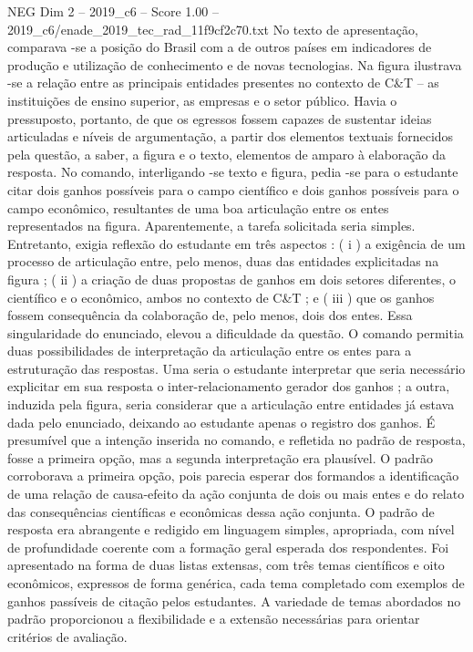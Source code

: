 \begin{textsample}{NEG Dim 2 – 2019\_c6 – Score 1.00 – 2019\_c6/enade\_2019\_tec\_rad\_11f9cf2c70.txt}
No texto de apresentação, comparava -se a posição do Brasil com a de outros países em indicadores de produção e utilização de conhecimento e de novas tecnologias.
Na figura ilustrava -se a relação entre as principais entidades presentes no contexto de C\&T – as instituições de ensino superior, as empresas e o setor público.
Havia o pressuposto, portanto, de que os egressos fossem capazes de sustentar ideias articuladas e níveis de argumentação, a partir dos elementos textuais fornecidos pela questão, a saber, a figura e o texto, elementos de amparo à elaboração da resposta.
No comando, interligando -se texto e figura, pedia -se para o estudante citar dois ganhos possíveis para o campo científico e dois ganhos possíveis para o campo econômico, resultantes de uma boa articulação entre os entes representados na figura.
Aparentemente, a tarefa solicitada seria simples.
Entretanto, exigia reflexão do estudante em três aspectos : ( i ) a exigência de um processo de articulação entre, pelo menos, duas das entidades explicitadas na figura ; ( ii ) a criação de duas propostas de ganhos em dois setores diferentes, o científico e o econômico, ambos no contexto de C\&T ; e ( iii ) que os ganhos fossem consequência da colaboração de, pelo menos, dois dos entes.
Essa singularidade do enunciado, elevou a dificuldade da questão.
O comando permitia duas possibilidades de interpretação da articulação entre os entes para a estruturação das respostas.
Uma seria o estudante interpretar que seria necessário explicitar em sua resposta o inter-relacionamento gerador dos ganhos ; a outra, induzida pela figura, seria considerar que a articulação entre entidades já estava dada pelo enunciado, deixando ao estudante apenas o registro dos ganhos.
É presumível que a intenção inserida no comando, e refletida no padrão de resposta, fosse a primeira opção, mas a segunda interpretação era plausível.
O padrão corroborava a primeira opção, pois parecia esperar dos formandos a identificação de uma relação de causa-efeito da ação conjunta de dois ou mais entes e do relato das consequências científicas e econômicas dessa ação conjunta.
O padrão de resposta era abrangente e redigido em linguagem simples, apropriada, com nível de profundidade coerente com a formação geral esperada dos respondentes.
Foi apresentado na forma de duas listas extensas, com três temas científicos e oito econômicos, expressos de forma genérica, cada tema completado com exemplos de ganhos passíveis de citação pelos estudantes.
A variedade de temas abordados no padrão proporcionou a flexibilidade e a extensão necessárias para orientar critérios de avaliação.

\end{textsample}
